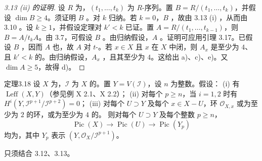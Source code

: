 \begin{proof}[3.13 (ii) 的证明]
设 $R$ 为，$(t_1,\ldots,t_k)$ 为 $R$-序列。置 $B=R/(t_1,\ldots,t_k)$，并假设 $\dim B\geq4$。须证明 $B$ 。对 $k$ 归纳。若 $k=0$，$B$ ，故由 3.13 (i) ，从而由 3.10 。设 $k\geq1$，并假设定理对 $k'<k$ 已证。置 $A=R/(t_1,\ldots,t_{k-1})$，则 $B=A/t_kA$。由 3.7，可假设 $B$ 。由归纳假设，$A$ 。证明可应用引理 3.17。已假设 $B$ ，因而 $A$ 也，故 $A$ 对 $t$-。若 $x\in X$ 且 $x$ 在 $X$ 中闭，则 $A_x$ 是至少为 $4$、且 $k'<k$ 的。由归纳假设，$A_x$ ，且其至少为 $4$。这给出 a)、c)、e)。又 $\dim A\geq5$，故得 d)。
\end{proof}
\begin{SGAresult}{定理}{3.18}
设 $X$ 为，$\mathcal I$ 为 $X$ 的。置 $Y=V(\mathcal I)$，设 $n$ 为整数。假设：
(i) 有 $\operatorname{Leff}(X,Y)$（参见例 X 2.1、X 2.2）；
(ii) 对每个 $p\geq n$，当 $i=1,2$ 时有 $H^i(Y,\mathcal I^{p+1}/\mathcal I^{p+2})=0$；
(iii) 对每个 $U\supset Y$ 及每个 $x\in X-U$，环 $\mathcal O_{X,x}$ 或为至少为 $2$ 的环，或为至少为 $4$ 的。
则对每个 $U\supset Y$ 及每个整数 $p\geq n$，
\[\operatorname{Pic}(X)\longrightarrow\operatorname{Pic}(U)\longrightarrow\operatorname{Pic}(Y_p)\]
均为，其中 $Y_p$ 表示 $(Y,\mathcal O_X/\mathcal I^{p+1})$。
\end{SGAresult}
只须结合 3.12、3.13。
